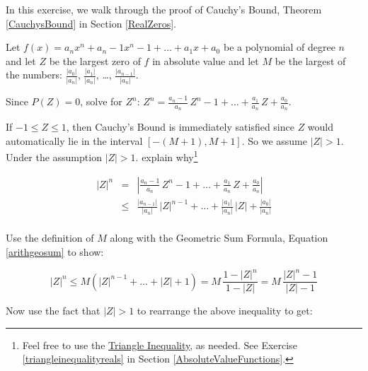 \documentclass{ximera}
\begin{document}
\begin{question}\label{CauchyBoundProofExercise}  
In this exercise, we walk through the proof of Cauchy's Bound, Theorem \ref{CauchysBound} in Section \ref{RealZeros}.  

Let $f(x) = a_{n} x^{n} + a_n-1x^n-1 + \ldots + a_1 x + a_0$ be a polynomial of degree $n$ and let $Z$ be the largest zero of $f$ in absolute value and let $M$ be the largest of the numbers: $\frac{|a_{0}|}{|a_{n}|}$, $\frac{|a_{1}|}{|a_{n}|}$, \ldots, $\frac{|a_{n-1}|}{|a_{n}|}$.


\begin{problem}
    Since $P(Z) = 0$, solve for $Z^{n}$:   $Z^{n} = \frac{a_n-1}{a_{n}} \, Z^n-1 + \ldots + \frac{a_1}{a_{n}} \,  Z + \frac{a_0}{a_{n}}$.
\end{problem}

\begin{problem}
    If $-1 \leq Z \leq 1$, then Cauchy's Bound is immediately satisfied since $Z$ would automatically lie in the interval $\left[-(M+1), M+1\right]$. So we assume $|Z|>1$. 
    Under the assumption $|Z|>1$. explain why\footnote{Feel free to use the \href{http://en.wikipedia.org/wiki/Triangle_inequality}{\underline{Triangle Inequality}}, as needed.  See Exercise \ref{triangleinequalityreals} in Section \ref{AbsoluteValueFunctions}.} 

\[\begin{array}{rcl} 

 |Z|^{n} & = &  \left| \frac{a_n-1}{a_{n}} \, Z^n-1 + \ldots + \frac{a_1}{a_{n}} \,  Z + \frac{a_0}{a_{n}} \right|  \\[10pt]
 
 & \leq &  \frac{|a_{n-1}|}{|a_{n}|} \, |Z|^{n-1} + \ldots + \frac{|a_{1}|}{|a_{n}|} \, |Z| + \frac{|a_{0}|}{|a_{n}|} \\ \end{array} \]
\end{problem}

\begin{problem}
    Use the definition of  $M$  along with the Geometric Sum Formula, Equation \ref{arithgeosum} to show:

\[ |Z|^{n} \leq M \left( |Z|^{n-1} + \ldots + |Z| + 1\right) = M \, \frac{1 - |Z|^n}{1 - |Z|} =  M \,  \frac{ |Z|^n - 1}{|Z| - 1} \]
\end{problem}

\begin{problem}
    Now use the fact that $|Z| > 1$ to rearrange the above inequality to get:


\end{problem}
\end{question}
\end{document}
